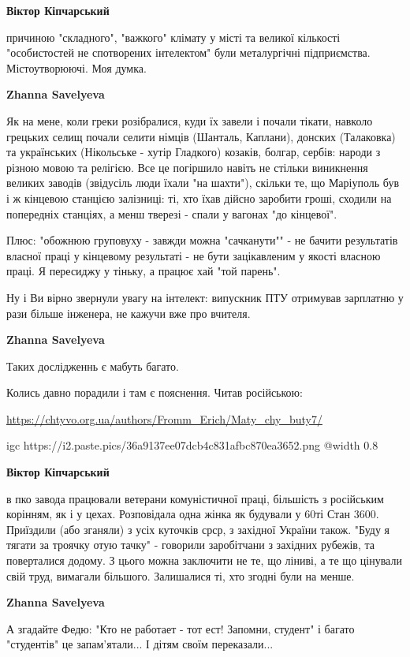 \begin{itemize}
\textbf{Віктор Кіпчарський} 

причиною "складного", "важкого" клімату у місті та великої кількості
"особистостей не спотворених інтелектом" були металургічні підприємства.
Містоутворюючі. Моя думка.

\textbf{Zhanna Savelyeva} 

Як на мене, коли греки розібралися, куди їх завели і почали тікати, навколо
грецьких селищ почали селити німців (Шанталь, Каплани), донских (Талаковка) та
українських (Нікольське - хутір Гладкого) козаків, болгар, сербів: народи з
різною мовою та релігією. Все це погіршило навіть не стільки виникнення великих
заводів (звідусіль люди їхали "на шахти"), скільки те, що Маріуполь був і ж
кінцевою станцією залізниці: ті, хто їхав дійсно заробити гроші, сходили на
попередніх станціях, а менш тверезі - спали у вагонах "до кінцевої".

Плюс: "обожнюю груповуху - завжди можна "сачканути"" - не бачити результатів
власної праці у кінцевому результаті - не бути зацікавленим у якості власною
праці. Я пересиджу у тіньку, а працює хай "той парень".

Ну і Ви вірно звернули увагу на інтелект: випускник ПТУ отримував зарплатню у
рази більше інженера, не кажучи вже про вчителя.

\textbf{Zhanna Savelyeva} 

Таких дослідженнь є мабуть багато.

Колись давно порадили і там є пояснення. Читав російською:

\url{https://chtyvo.org.ua/authors/Fromm_Erich/Maty_chy_buty7/}

\ifcmt
  igc https://i2.paste.pics/36a9137ee07dcb4c831afbc870ea3652.png
	@width 0.8
\fi

\textbf{Віктор Кіпчарський} 

в пко завода працювали ветерани комуністичної праці, більшість з російським
корінням, як і у цехах. Розповідала одна жінка як будували у 60ті Стан 3600.
Приїздили (або зганяли) з усіх куточків срср, з західної України також. "Буду я
тягати за троячку отую тачку" - говорили заробітчани з західних рубежів, та
поверталися додому. З цього можна заключити не те, що ліниві, а те що цінували
свій труд, вимагали більшого. Залишалися ті, хто згодні були на менше.

\textbf{Zhanna Savelyeva} 

А згадайте Федю: "Кто не работает - тот ест! Запомни, студент" і багато
"студентів" це запам'ятали... І дітям своїм переказали...


\end{itemize}
